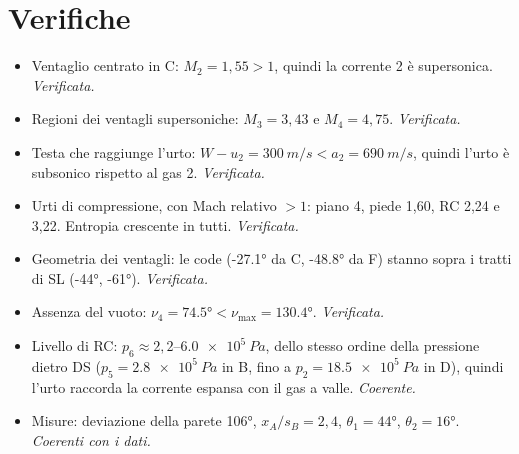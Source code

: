 \documentclass[11pt,a4paper]{article}
\begin{document}
\section{Verifiche}
\begin{itemize}
\item Ventaglio centrato in C: $M_2=1{,}55>1$, quindi la corrente 2 è supersonica. \emph{Verificata.}
\item Regioni dei ventagli supersoniche: $M_3=3{,}43$ e $M_4=4{,}75$. \emph{Verificata.}
\item Testa che raggiunge l'urto: $W-u_2=\SI{300}{m/s}<a_2=\SI{690}{m/s}$, quindi l'urto è subsonico rispetto
  al gas 2. \emph{Verificata.}
\item Urti di compressione, con Mach relativo $>1$: piano 4, piede 1,60, RC 2,24 e 3,22. Entropia crescente in tutti.
  \emph{Verificata.}
\item Geometria dei ventagli: le code (\ang{-27.1} da C, \ang{-48.8} da F) stanno sopra i tratti di SL
  (\ang{-44}, \ang{-61}). \emph{Verificata.}
\item Assenza del vuoto: $\nu_4=\ang{74.5}<\nu_{\max}=\ang{130.4}$. \emph{Verificata.}
\item Livello di RC: $p_6\approx2{,}2$--$\SI{6.0e5}{Pa}$, dello stesso ordine della pressione dietro DS
  ($p_5=\SI{2.8e5}{Pa}$ in B, fino a $p_2=\SI{18.5e5}{Pa}$ in D), quindi l'urto raccorda la corrente espansa con il gas
  a valle. \emph{Coerente.}
\item Misure: deviazione della parete \ang{106}, $x_A/s_B=2{,}4$, $\theta_1=\ang{44}$, $\theta_2=\ang{16}$.
  \emph{Coerenti con i dati.}
\end{itemize}

\end{document}
